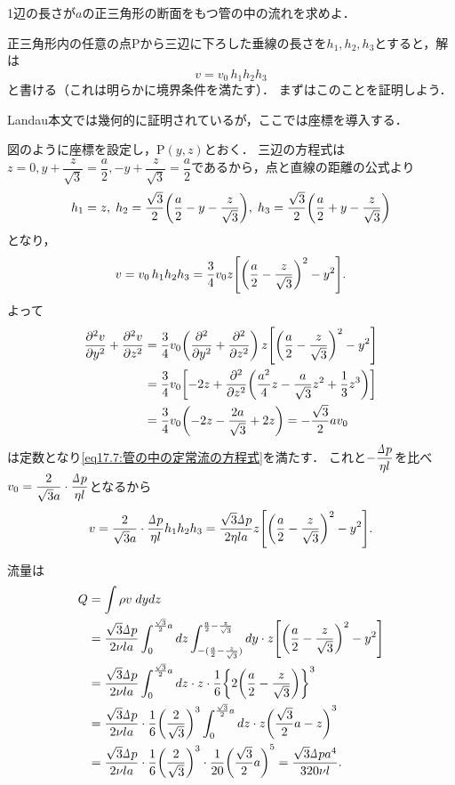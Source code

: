 \begin{mondai}{}{}
1辺の長さが$a$の正三角形の断面をもつ管の中の流れを求めよ．
\end{mondai}
\begin{kaitou}
正三角形内の任意の点Pから三辺に下ろした垂線の長さを$h_1, h_2, h_3$とすると，解は
\[
    v = v_0 \, h_1h_2h_3
\]
と書ける（これは明らかに境界条件を満たす）．
まずはこのことを証明しよう．

\begin{details}
Landau本文では幾何的に証明されているが，ここでは座標を導入する．
\end{details}

図のように座標を設定し，$\mathrm{P}(y,z)$とおく．
三辺の方程式は$z=0, y+\dfrac{z}{\sqrt{3}}=\dfrac{a}{2}, -y+\dfrac{z}{\sqrt{3}}=\dfrac{a}{2}$であるから，点と直線の距離の公式より
\[
    h_1 = z, \;
    h_2 = \frac{\sqrt{3}}{2} \pqty{ \frac{a}{2} - y - \frac{z}{\sqrt{3}} }, \;
    h_3 = \frac{\sqrt{3}}{2} \pqty{ \frac{a}{2} + y - \frac{z}{\sqrt{3}} }
\]
となり，
\[
    v = v_0 \, h_1h_2h_3
    = \frac{3}{4} v_0 z \bqty{ \pqty{\frac{a}{2} - \frac{z}{\sqrt{3}}}^2 -y^2 } .
\]
よって
\begin{align*}
    \pdv[2]{v}{y} + \pdv[2]{v}{z} &=
    \frac{3}{4} v_0 \pqty{\pdv[2]{y} + \pdv[2]{z}} \, z \bqty{ \pqty{\frac{a}{2} - \frac{z}{\sqrt{3}}}^2 -y^2 } \\
    &= \frac{3}{4} v_0 \bqty{ -2z + \pdv[2]{z} \pqty{ \frac{a^2}{4}z - \frac{a}{\sqrt{3}}z^2 + \frac{1}{3}z^3 } } \\
    &= \frac{3}{4} v_0 \pqty{ -2z - \frac{2a}{\sqrt{3}} + 2z } = - \frac{\sqrt{3}}{2}av_0
\end{align*}
は定数となり\eqref{eq17.7:管の中の定常流の方程式}を満たす．
これと$-\dfrac{\D p}{\eta l}$を比べ$v_0 = \dfrac{2}{\sqrt{3}a} \cdot \dfrac{\D p}{\eta l}$となるから
\[
    v = \frac{2}{\sqrt{3}a} \cdot \frac{\D p}{\eta l} h_1h_2h_3
    = \frac{\sqrt{3}\D p}{2\eta la} z \bqty{ \pqty{\frac{a}{2} - \frac{z}{\sqrt{3}}}^2 -y^2 } .
\]


流量は
\begin{align*}
    Q &= \int \rho v \; dydz \\
    &= \frac{\sqrt{3}\D p}{2\nu la} \int_0^{\frac{\sqrt{3}}{2}a} dz \int_{-(\frac{a}{2} - \frac{z}{\sqrt{3}})}^{\frac{a}{2} - \frac{z}{\sqrt{3}}} dy \cdot z \bqty{ \pqty{\frac{a}{2} - \frac{z}{\sqrt{3}}}^2 -y^2 } \\
    &= \frac{\sqrt{3}\D p}{2\nu la} \int_0^{\frac{\sqrt{3}}{2}a} dz \cdot z \cdot \frac{1}{6} \Bqty{2\pqty{\frac{a}{2} - \frac{z}{\sqrt{3}}}}^3 \\
    &= \frac{\sqrt{3}\D p}{2\nu la} \cdot \frac{1}{6} \pqty{\frac{2}{\sqrt{3}}}^3 \int_0^{\frac{\sqrt{3}}{2}a} dz \cdot z \pqty{ \frac{\sqrt{3}}{2}a-z }^3 \\
    &= \frac{\sqrt{3}\D p}{2\nu la} \cdot \frac{1}{6} \pqty{\frac{2}{\sqrt{3}}}^3 \cdot \frac{1}{20} \pqty{\frac{\sqrt{3}}{2}a}^5
    = \frac{\sqrt{3}\D p a^4}{320 \nu l} .
\end{align*}


\end{kaitou}
